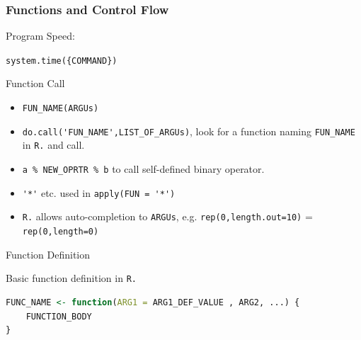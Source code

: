     




\subsubsection{Functions and Control Flow}
\begin{point}
    Program Speed:
\end{point}

\lstinline|system.time({COMMAND})|

\begin{point}
    Function Call
\end{point}
\begin{itemize}[topsep=2pt,itemsep=0pt]
    \item \lstinline|FUN_NAME(ARGUs)|
    \item \lstinline|do.call('FUN_NAME',LIST_OF_ARGUs)|, look for a function naming \lstinline|FUN_NAME| in \lstinline|R.| and call. 
    \item \lstinline|a % NEW_OPRTR % b| to call self-defined binary operator.
    \item \lstinline|'*'| etc. used in \lstinline|apply(FUN = '*')|
    \item \lstinline|R.| allows auto-completion to \lstinline|ARGUs|, e.g. \lstinline|rep(0,length.out=10)| = \lstinline|rep(0,length=0)|
\end{itemize}


\begin{point}
    Function Definition
\end{point}

\begin{rcode}
    Basic function definition in \lstinline|R.|
\begin{lstlisting}[language=R]
FUNC_NAME <- function(ARG1 = ARG1_DEF_VALUE , ARG2, ...) {
    FUNCTION_BODY
}
\end{lstlisting}
\end{rcode}

